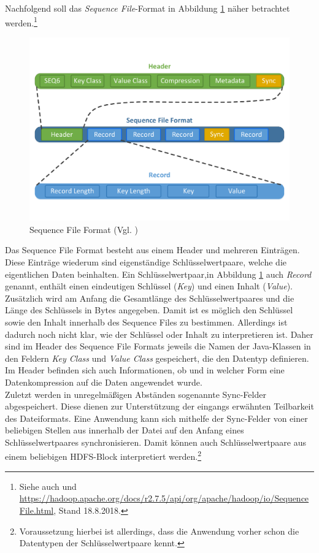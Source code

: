 \noindent
Nachfolgend soll das \textit{Sequence File}-Format in Abbildung \ref{fig:sequence_file_format} näher betrachtet werden.\footnote{Siehe auch \cite[S. 134]{hadoop_definitive_guide} und \url{https://hadoop.apache.org/docs/r2.7.5/api/org/apache/hadoop/io/SequenceFile.html}, Stand 18.8.2018.}

\begin{figure}[ht]
  \centering
  \includegraphics[width=\textwidth]{./resource/sequence_file_format.pdf}
  \caption{Sequence File Format (Vgl. \cite[S. 134]{hadoop_definitive_guide})}
  \label{fig:sequence_file_format}
\end{figure}

\noindent
Das Sequence File Format besteht aus einem Header und mehreren Einträgen. Diese Einträge wiederum sind eigenständige Schlüsselwertpaare, welche die eigentlichen Daten beinhalten. Ein Schlüsselwertpaar,in Abbildung \ref{fig:sequence_file_format} auch \textit{Record} genannt, enthält einen eindeutigen Schlüssel (\textit{Key}) und einen Inhalt (\textit{Value}). Zusätzlich wird am Anfang die Gesamtlänge des Schlüsselwertpaares und die Länge des Schlüssels in Bytes angegeben. Damit ist es möglich den Schlüssel sowie den Inhalt innerhalb des Sequence Files zu bestimmen. Allerdings ist dadurch noch nicht klar, wie der Schlüssel oder Inhalt zu interpretieren ist. Daher sind im Header des Sequence File Formats jeweils die Namen der Java-Klassen in den Feldern \textit{Key Class} und \textit{Value Class} gespeichert, die den Datentyp definieren.  
Im Header befinden sich auch Informationen, ob und in welcher Form eine Datenkompression auf die Daten angewendet wurde.\\
Zuletzt werden in unregelmäßigen Abständen sogenannte Sync-Felder abgespeichert. Diese dienen zur Unterstützung der eingangs erwähnten Teilbarkeit des Dateiformats. Eine Anwendung kann sich mithelfe der Sync-Felder von einer beliebigen Stellen aus innerhalb der Datei auf den Anfang eines Schlüsselwertpaares synchronisieren. Damit können auch Schlüsselwertpaare aus einem beliebigen HDFS-Block interpretiert werden.\footnote{Voraussetzung hierbei ist allerdings, dass die Anwendung vorher schon die Datentypen der Schlüsselwertpaare kennt.}\\ 

